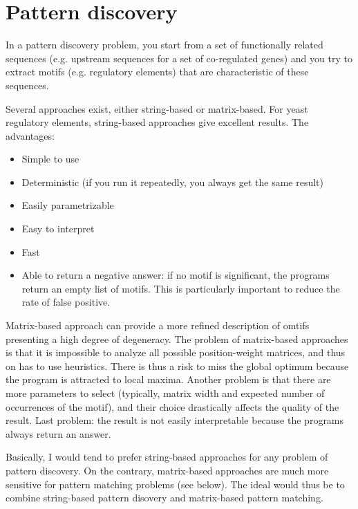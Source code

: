 \section{Pattern discovery}

In a pattern discovery problem, you start from a set of
functionally related sequences (e.g.  upstream sequences for a set of
co-regulated genes) and you try to extract motifs (e.g. regulatory
elements) that are characteristic of these sequences.

Several approaches exist, either string-based or matrix-based. For
yeast regulatory elements, string-based approaches give excellent
results. The advantages:

\begin{itemize}
\item Simple to use
\item Deterministic (if you run it repeatedly, you always get the same result)
\item Easily parametrizable
\item Easy to interpret
\item Fast
\item Able to return a negative answer: if no motif is significant,
the programs return an empty list of motifs. This is particularly
important to reduce the rate of false positive.
\end{itemize}

Matrix-based approach can provide a more refined description of omtifs
presenting a high degree of degeneracy. The problem of matrix-based
approaches is that it is impossible to analyze all possible
position-weight matrices, and thus on has to use heuristics. There is
thus a risk to miss the global optimum because the program is
attracted to local maxima. Another problem is that there are more
parameters to select (typically, matrix width and expected number of
occurrences of the motif), and their choice drastically affects the
quality of the result. Last problem: the result is not easily
interpretable because the programs always return an answer.

Basically, I would tend to prefer string-based approaches for any
problem of pattern discovery. On the contrary, matrix-based approaches
are much more sensitive for pattern matching problems (see below). The
ideal would thus be to combine string-based pattern disovery and
matrix-based pattern matching.

